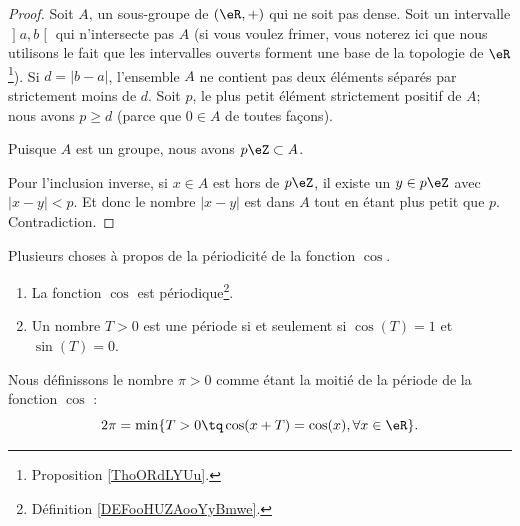 \begin{proof}
	Soit \( A\), un sous-groupe de \( (\eR,+)\) qui ne soit pas dense. Soit un intervalle \( \mathopen] a , b \mathclose[\) qui n'intersecte pas \( A\) (si vous voulez frimer, vous noterez ici que nous utilisons le fait que les intervalles ouverts forment une base de la topologie de \( \eR\)\footnote{Proposition \ref{ThoORdLYUu}.}). Si \( d=| b-a |\), l'ensemble \( A\) ne contient pas deux éléments séparés par strictement moins de \( d\). Soit \( p\), le plus petit élément strictement positif de \( A\); nous avons \( p\geq d\) (parce que \( 0\in A\) de toutes façons).

	Puisque \( A\) est un groupe, nous avons \( p\eZ\subset A\).

	Pour l'inclusion inverse, si \( x\in A\) est hors de \( p\eZ\), il existe un \( y\in p\eZ\) avec \( | x-y |<p\). Et donc le nombre \( | x-y |\) est dans \( A\) tout en étant plus petit que \( p\). Contradiction.
\end{proof}

\begin{propositionDef}      \label{PROPooFRVCooKSgYUM}
	Plusieurs choses à propos de la périodicité de la fonction \( \cos\).
	\begin{enumerate}
		\item
		      La fonction \( \cos\) est périodique\footnote{Définition \ref{DEFooHUZAooYyBmwe}.}.
		\item       \label{ITEMooVPMWooBqidZG}
		      Un nombre \( T>0\) est une période si et seulement si \( \cos(T)=1\) et \( \sin(T)=0\).
	\end{enumerate}

	Nous définissons le nombre \( \pi>0\) comme étant la moitié de la période de la fonction \( \cos\) :
	\begin{equation}
		2\pi=\min\{ T>0\tq \cos(x+T)=\cos(x) , \forall x \in \eR\}.
	\end{equation}

\end{propositionDef}

